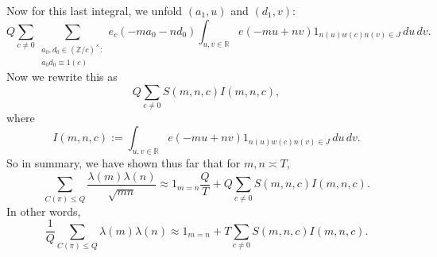 \documentclass[reqno]{amsart} 
\begin{document}
Now for this last integral, we unfold $(a_1,u)$ and $(d_1,v)$:
\begin{equation*}
  Q \sum _{c \neq 0} \sum _{
    \substack{
      a_0, d_0 \in (\mathbb{Z} / c)^\times :  \\
       a_0 d_0 \equiv  1(c)
    }
  }
  e_c(-m a_0 - n d_0)
  \int _{u, v \in \mathbb{R}}
  e (- mu + n v )
  1 _{n (u) w(c) n(v) \in J
  }
  \, d u \, d v.
\end{equation*}
Now we rewrite this as
\begin{equation*}
  Q \sum _{c \neq 0}
  S(m,n,c)
  I(m,n,c),
\end{equation*}
where
\begin{equation}\label{eqn:20230522164836}
  I(m,n,c) :=
  \int _{u, v \in \mathbb{R}}
  e (- mu + n v )
  1 _{n (u) w(c) n(v) \in J
  }
  \, d u \, d v.
\end{equation}
So in summary, we have shown thus far that for $m, n \asymp T$,
\begin{equation*}
  \sum _{C(\pi) \leq Q}
  \frac{\lambda(m) \lambda(n)}{ \sqrt{m n }}
  \approx
  1 _{m = n} \frac{Q}{T}
  + Q \sum _{c \neq 0} S (m, n, c) I (m,n ,c).
\end{equation*}
In other words,
\begin{equation}\label{eqn:20230522165006}
  \frac{1}{Q}
  \sum _{C(\pi) \leq Q}
  \lambda(m) \lambda(n)
  \approx
  1 _{m = n}
  + T \sum _{c \neq 0} S (m, n, c) I (m,n ,c).
\end{equation}
\end{document}
